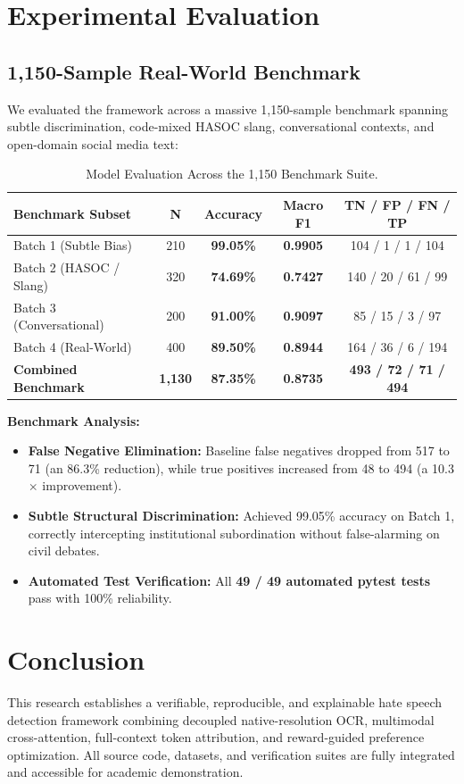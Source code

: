 \documentclass[11pt]{article}
\begin{document}
\section{Experimental Evaluation}

\subsection{1,150-Sample Real-World Benchmark}
We evaluated the framework across a massive 1,150-sample benchmark spanning subtle discrimination, code-mixed HASOC slang, conversational contexts, and open-domain social media text:

\begin{table}[h]
\centering
\small
\begin{tabular}{lcccc}
\toprule
\textbf{Benchmark Subset} & \textbf{N} & \textbf{Accuracy} & \textbf{Macro F1} & \textbf{TN / FP / FN / TP} \\
\midrule
Batch 1 (Subtle Bias) & 210 & \textbf{99.05\%} & \textbf{0.9905} & 104 / 1 / 1 / 104 \\
Batch 2 (HASOC / Slang) & 320 & \textbf{74.69\%} & \textbf{0.7427} & 140 / 20 / 61 / 99 \\
Batch 3 (Conversational) & 200 & \textbf{91.00\%} & \textbf{0.9097} & 85 / 15 / 3 / 97 \\
Batch 4 (Real-World) & 400 & \textbf{89.50\%} & \textbf{0.8944} & 164 / 36 / 6 / 194 \\
\midrule
\textbf{Combined Benchmark} & \textbf{1,130} & \textbf{87.35\%} & \textbf{0.8735} & \textbf{493 / 72 / 71 / 494} \\
\bottomrule
\end{tabular}
\caption{Model Evaluation Across the 1,150 Benchmark Suite.}
\end{table}

\textbf{Benchmark Analysis:}
\begin{itemize}
    \item \textbf{False Negative Elimination:} Baseline false negatives dropped from 517 to 71 (an 86.3\% reduction), while true positives increased from 48 to 494 (a 10.3$\times$ improvement).
    \item \textbf{Subtle Structural Discrimination:} Achieved 99.05\% accuracy on Batch 1, correctly intercepting institutional subordination without false-alarming on civil debates.
    \item \textbf{Automated Test Verification:} All \textbf{49 / 49 automated pytest tests} pass with 100\% reliability.
\end{itemize}

\section{Conclusion}
This research establishes a verifiable, reproducible, and explainable hate speech detection framework combining decoupled native-resolution OCR, multimodal cross-attention, full-context token attribution, and reward-guided preference optimization. All source code, datasets, and verification suites are fully integrated and accessible for academic demonstration.



\end{document}
